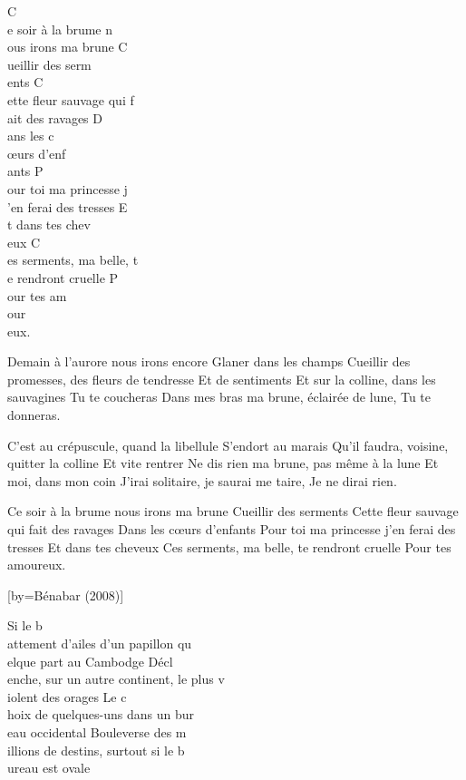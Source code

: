 \beginverse
C\\[Mi]e soir à la brume n\\[Lam]ous irons ma brune
C\\[Rém]ueillir des serm\\[Sol7]ents
C\\[Do]ette fleur sauvage qui f\\[Lam]ait des ravages
D\\[Rém]ans les c\\[Sol7]œurs d'enf\\[Do]ants
P\\[Fa]our toi ma princesse j\\[Sol]'en ferai des tresses
E\\[Sol7]t dans tes chev\\[Do]eux
C\\[Mi7]es serments, ma belle, t\\[Lam]e rendront cruelle
P\\[Rém]our tes am\\[Sol7]our\\[Do]eux.
\endverse

\beginverse
Demain à l'aurore nous irons encore
Glaner dans les champs
Cueillir des promesses, des fleurs de tendresse
Et de sentiments
Et sur la colline, dans les sauvagines
Tu te coucheras
Dans mes bras ma brune, éclairée de lune,
Tu te donneras.
\endverse

\beginverse
C'est au crépuscule, quand la libellule
S'endort au marais
Qu'il faudra, voisine, quitter la colline
Et vite rentrer
Ne dis rien ma brune, pas même à la lune
Et moi, dans mon coin
J'irai solitaire, je saurai me taire,
Je ne dirai rien.
\endverse

\beginverse
Ce soir à la brume nous irons ma brune
Cueillir des serments
Cette fleur sauvage qui fait des ravages
Dans les cœurs d'enfants
Pour toi ma princesse j'en ferai des tresses
Et dans tes cheveux
Ces serments, ma belle, te rendront cruelle
Pour tes amoureux.
\endverse

[by={Bénabar (2008)}]

\beginverse
Si le b\\[Do]attement d'ailes d'un papillon qu\\[Lam]elque part au Cambodge
Décl\\[Do]enche, sur un autre continent, le plus v\\[Lam]iolent des orages
Le c\\[Fa]hoix de quelques-uns dans un bur\\[Lam]eau occidental
Bouleverse des m\\[Fa]illions de destins, surtout si le b\\[Sol]ureau est ovale
\endverse

